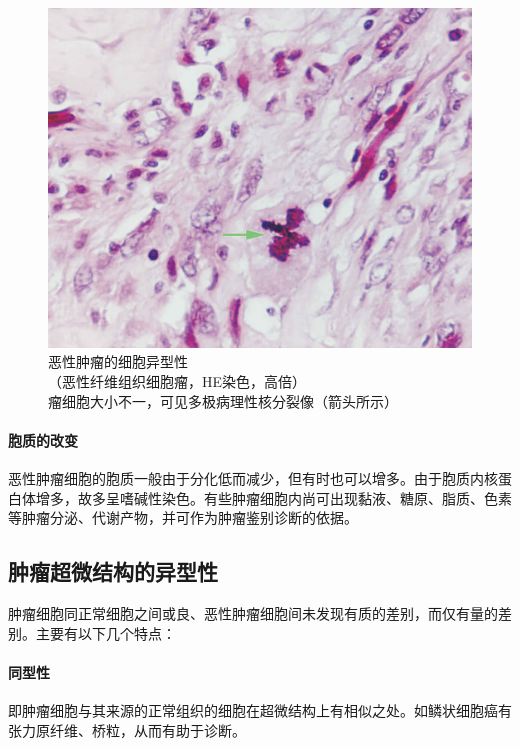 \begin{figure}[!htbp]
  \centering
  \includegraphics{./images/Image00071.jpg}
  \captionsetup{justification=centering}
  \caption{恶性肿瘤的细胞异型性\\{\small （恶性纤维组织细胞瘤，HE染色，高倍）\\
  瘤细胞大小不一，可见多极病理性核分裂像（箭头所示）}}
  \label{fig5-4}
\end{figure}



\paragraph{胞质的改变}
恶性肿瘤细胞的胞质一般由于分化低而减少，但有时也可以增多。由于胞质内核蛋白体增多，故多呈嗜碱性染色。有些肿瘤细胞内尚可出现黏液、糖原、脂质、色素等肿瘤分泌、代谢产物，并可作为肿瘤鉴别诊断的依据。

\subsection{肿瘤超微结构的异型性}

肿瘤细胞同正常细胞之间或良、恶性肿瘤细胞间未发现有质的差别，而仅有量的差别。主要有以下几个特点：

\paragraph{同型性}
即肿瘤细胞与其来源的正常组织的细胞在超微结构上有相似之处。如鳞状细胞癌有张力原纤维、桥粒，从而有助于诊断。

